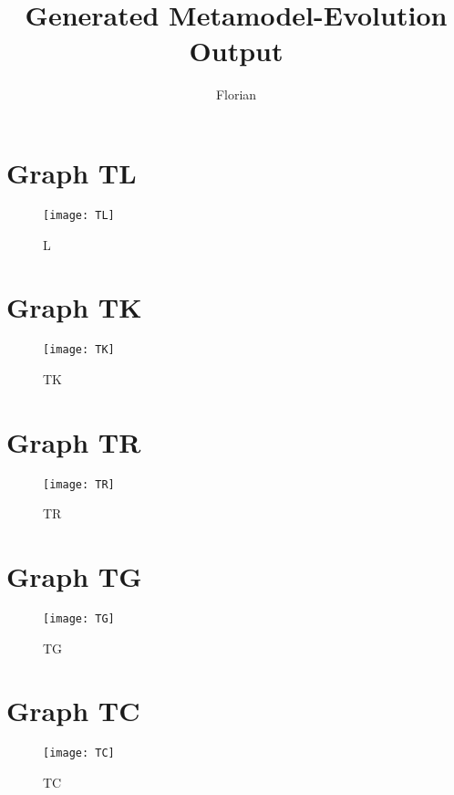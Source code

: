 \documentclass[a4paper,10pt]{article}
\title{Generated Metamodel-Evolution Output}
\author{Florian}
\begin{document}
\maketitle

\begin{abstract}

\end{abstract}

\section{Graph TL}

\begin{figure}[h!]
  \centering
    \texttt{[image: TL]}
  \caption{L}
\end{figure}

\section{Graph TK}

\begin{figure}[h!]
  \centering
    \texttt{[image: TK]}
  \caption{TK}
\end{figure}

\section{Graph TR}

\begin{figure}[h!]
  \centering
    \texttt{[image: TR]}
  \caption{TR}
\end{figure}

\section{Graph TG}

\begin{figure}[h!]
  \centering
    \texttt{[image: TG]}
  \caption{TG}
\end{figure}

\section{Graph TC}

\begin{figure}[h!]
  \centering
    \texttt{[image: TC]}
  \caption{TC}
\end{figure}
\end{document}
